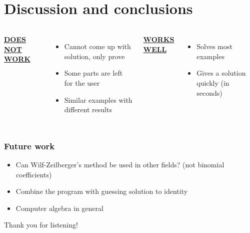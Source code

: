 \documentclass{beamer}
\newcommand{\ubf}[1]{\underline{\textbf{#1}}}
\begin{document}
\section{Discussion and conclusions}
\begin{frame}
  \begin{columns}[t]

  \center
  \ubf{DOES NOT WORK}

  \justify
  \begin{itemize}
    \item<2-> Cannot come up with solution, only prove
    \item<3-> Some parts are left for the user
    \item<4-> Similar examples with different results
  \end{itemize}
  \center
  \ubf{WORKS WELL}

  \justify
  \begin{itemize}
    \item<5-> Solves most examples
    \item<6-> Gives a solution quickly (in seconds)
  \end{itemize}
  \end{columns}
\end{frame}
\begin{frame}
  \frametitle{Future work}
  \pause
  \begin{itemize}
    \item Can Wilf-Zeilberger's method be used in other fields? (not binomial coefficients)
    \pause
    \item Combine the program with guessing solution to identity
    \pause
    \item Computer algebra in general
  \end{itemize}
\end{frame}
\begin{frame}
  \Huge\center
  Thank you for listening!
\end{frame}

\appendix
\end{document}
